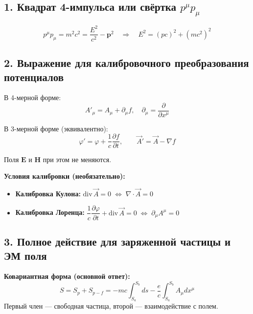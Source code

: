 \documentclass[10pt]{article}
\begin{document}

\subsection*{1. Квадрат 4-импульса или свёртка $p^\mu p_\mu$}
$$p^\mu p_\mu = m^2 c^2 = \frac{E^2}{c^2} - \mathbf{p}^2 \quad \Rightarrow \quad E^2 = (pc)^2 + (mc^2)^2$$

\subsection*{2. Выражение для калибровочного преобразования потенциалов}
В 4-мерной форме:
$$A'_\mu = A_\mu + \partial_\mu f, \quad \partial_\mu = \frac{\partial}{\partial x^\mu}$$

В 3-мерной форме (эквивалентно):
$$\varphi' = \varphi + \frac{1}{c}\frac{\partial f}{\partial t}, \qquad \vec{A}' = \vec{A} - \nabla f$$

Поля $\mathbf{E}$ и $\mathbf{H}$ при этом не меняются.

\textbf{Условия калибровки (необязательно):}
\begin{itemize}
\item \textbf{Калибровка Кулона:} $\text{div}\,\vec{A} = 0 \;\Leftrightarrow\; \nabla\cdot\vec{A} = 0$
\item \textbf{Калибровка Лоренца:} $\dfrac{1}{c}\dfrac{\partial\varphi}{\partial t} + \text{div}\,\vec{A} = 0 \;\Leftrightarrow\; \partial_\mu A^\mu = 0$
\end{itemize}

\subsection*{3. Полное действие для заряженной частицы и ЭМ поля}
\textbf{Ковариантная форма (основной ответ):}
$$S = S_p + S_{p-f}= -mc\int_{S_a}^{S_b} ds - \frac{e}{c}\int_{S_a}^{S_b} A_\mu dx^\mu$$
Первый член — свободная частица, второй — взаимодействие с полем.


\end{document}
